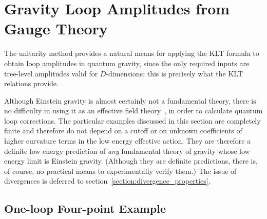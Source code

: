 \newpage

\section{Gravity Loop Amplitudes from Gauge Theory}
\label{section:gravity_loops}

The unitarity method provides a natural means for applying the KLT
formula to obtain loop amplitudes in quantum gravity, since the only
required inputs are tree-level amplitudes valid for $D$-dimensions;
this is precisely what the KLT relations provide.

Although Einstein gravity is almost certainly not a fundamental theory,
there is no difficulty in using it as an effective field
theory~\cite{Weinberg79,Gasser85,Donoghue94,Kaplan95,Manohar96}, in
order to calculate quantum loop corrections.  The particular examples
discussed in this section are completely finite and therefore do not
depend on a cutoff or on unknown coefficients of higher curvature
terms in the low energy effective action.  They are therefore a
definite low energy prediction of {\it any} fundamental theory of
gravity whose low energy limit is Einstein gravity.  (Although they
are definite predictions, there is, of course, no practical means to
experimentally verify them.)  The issue of divergences is deferred to
section~\ref{section:divergence_properties}.

\subsection{One-loop Four-point Example}

